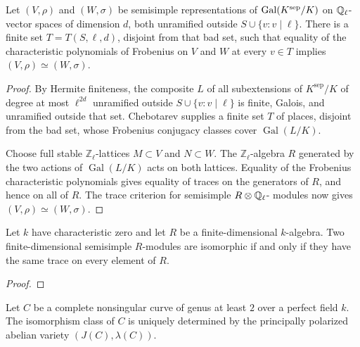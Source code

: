 \begin{lemma}
\label{lem:milne-semisimple-module-finiteness}

Let $(V,\rho)$ and $(W,\sigma)$ be semisimple representations of
$\operatorname{Gal}(K^{\mathrm{sep}}/K)$ on $\mathbb{Q}_\ell$-vector spaces of dimension $d$, both
unramified outside $S\cup\{v:v\mid\ell\}$.  There is a finite set
$T=T(S,\ell,d)$, disjoint from that bad set, such that equality of the
characteristic polynomials of Frobenius on $V$ and $W$ at every $v\in T$ implies
$(V,\rho)\simeq(W,\sigma)$.
\end{lemma}

\begin{proof}

By Hermite finiteness, the composite $L$ of all subextensions of
$K^{\mathrm{sep}}/K$ of degree at most $\ell^{2d}$ unramified outside
$S\cup\{v:v\mid\ell\}$ is finite, Galois, and unramified outside that set.
Chebotarev supplies a finite set $T$ of places, disjoint from the bad set,
whose Frobenius conjugacy classes cover $\operatorname{Gal}(L/K)$.

Choose full stable $\mathbb Z_\ell$-lattices $M\subset V$ and $N\subset W$.
The $\mathbb Z_\ell$-algebra $R$ generated by the two actions of
$\operatorname{Gal}(L/K)$ acts on both lattices.  Equality of the Frobenius
characteristic polynomials gives equality of traces on the generators of $R$,
and hence on all of $R$.  The trace criterion for semisimple $R\otimes\mathbb{Q}_\ell$-
modules now gives $(V,\rho)\simeq(W,\sigma)$.

\end{proof}


\begin{lemma}
\label{lem:milne-endomorphism-algebra-bound}

Let $k$ have characteristic zero and let $R$ be a finite-dimensional
$k$-algebra.  Two finite-dimensional semisimple $R$-modules are isomorphic if
and only if they have the same trace on every element of $R$.
\end{lemma}

\begin{proof}
\notready

\end{proof}


\begin{theorem}
\label{thm:milne-rational-torelli}

Let $C$ be a complete nonsingular curve of genus at least $2$ over a perfect
field $k$.  The isomorphism class of $C$ is uniquely determined by the
principally polarized abelian variety $(J(C),\lambda(C))$.
\end{theorem}

